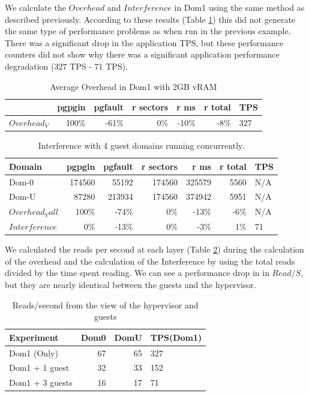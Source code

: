 We calculate the $Overhead$ and $Interference$ in Dom1 using the same method as described previously. 
According to these results (Table \ref{tab:IntMedA}) this did not generate the same type of performance problems as when run in the previous example.  
There was a significant drop in the application TPS, but these performance counters did not show why there was a significant application performance degradation (327 TPS - 71 TPS).

\begin{table}[h]
\begin{tabular}{ l r r r r r p{5cm} }
	         & pgpgin & pgfault & r sectors & r ms	& r total & TPS \\
	\hline
	$Overhead_V$ & 100\%  & -61\%	 &      0\%	 & -10\% &    -8\% &  327 \\
\end{tabular}
\caption{Average Overhead in Dom1 with 2GB vRAM}
\end{table}

\begin{table}[h]
\begin{tabular}{ l r r r r r p{5cm} }
	Domain  & pgpgin & pgfault & r sectors & r ms	& r total & TPS \\
	\hline
	Dom-0	& 174560 &	55192 &	174560 &	325579 &	5560 & N/A \\
    Dom-U	& 87280	 & 213934 & 174560 &    374942 &    5951 & N/A \\
	$Overhead_Vall$ & 100\%  &   -74\%&  0\%   &    -13\% &    -6\%  & N/A \\
    $Interference$ & 0\% & -13\% & 0\%   &     -3\% &     1\%  & 71 \\
\end{tabular}
\caption{Interference with 4 guest domains running concurrently.}
\label{tab:IntMedA}
\end{table}

We calculated the reads per second at each layer (Table \ref{fig:rps}) during the calculation of the overhead and the calculation of the Interference by using the total reads divided by the time spent reading.    We can see a performance drop in in $Read/S$, but they are nearly identical between the guests and the hypervisor.  
\begin{table}[!h]
\begin{tabular}{ l r r p{5cm} }
	Experiment     & Dom0 & DomU  & TPS(Dom1) \\
	\hline
    Dom1 (Only)    & 67 & 65 & 327 \\
    Dom1 + 1 guest & 32 & 33 & 152 \\
    Dom1 + 3 guests& 16 & 17 &  71 \\
\end{tabular}
\caption{Reads/second from the view of the hypervisor and guests}
\label{fig:rps}
\end{table}

